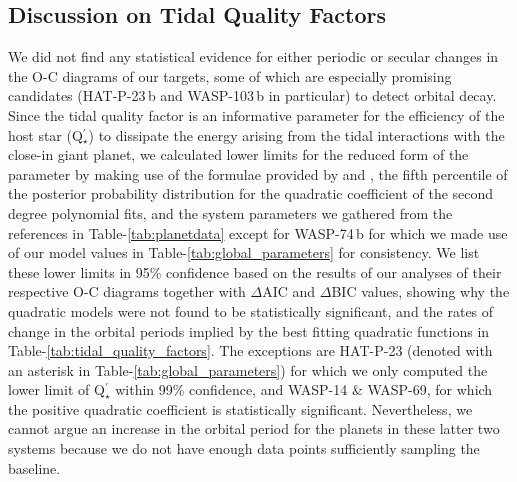 \documentclass[a4paper,fleqn,usenatbib]{mnras}
\begin{document}
\subsection{Discussion on Tidal Quality Factors}
\label{subsec:tidal_quality}
We did not find any statistical evidence for either periodic or secular changes in the O-C diagrams of our targets, some of which are especially promising candidates (HAT-P-23\,b and WASP-103\,b in particular) to detect orbital decay. Since the tidal quality factor is an informative parameter for the efficiency of the host star (Q$_{\star}^{\prime}$) to dissipate the energy arising from the tidal interactions with the close-in giant planet, we calculated lower limits for the reduced form of the parameter by making use of the formulae provided by \cite{2014ARA&A..52..171O} and \cite{2018AcA....68..371M}, the fifth percentile of the posterior probability distribution for the quadratic coefficient of the second degree polynomial fits, and the system parameters we gathered from the references in Table-\ref{tab:planetdata} except for WASP-74\,b for which we made use of our model values in Table-\ref{tab:global_parameters} for consistency. We list these lower limits in 95\% confidence based on the results of our analyses of their respective O-C diagrams together with $\Delta$AIC and $\Delta$BIC values, showing why the quadratic models were not found to be statistically significant, and the rates of change in the orbital periods implied by the best fitting quadratic functions in Table-\ref{tab:tidal_quality_factors}. The exceptions are HAT-P-23 (denoted with an asterisk in Table-\ref{tab:global_parameters}) for which we only computed the lower limit of Q$^{\prime}_{\star}$ within 99\% confidence, and WASP-14 \& WASP-69, for which the positive quadratic coefficient is statistically significant. Nevertheless, we cannot argue an increase in the orbital period for the planets in these latter two systems because we do not have enough data points sufficiently sampling the baseline.
\end{document}
